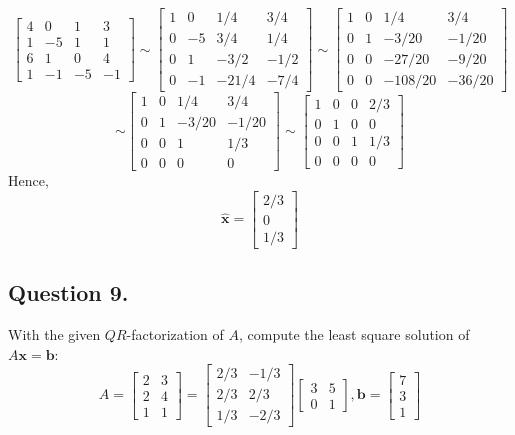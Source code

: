 \documentclass{article}
\begin{document}
\begin{enumerate} [label=(\arabic*)]
    \[\left[\begin{array}{rrrr}
    4 & 0 & 1 & 3 \\
    1 &-5 & 1 & 1 \\
    6 & 1 & 0 & 4 \\
    1 &-1 &-5 & -1
    \end{array}\right]\sim
    \left[\begin{array}{rrrr}
    1 & 0 & 1/4 & 3/4 \\
    0 &-5 & 3/4 & 1/4 \\
    0 & 1 &-3/2 &-1/2 \\
    0 &-1 &-21/4&-7/4
    \end{array}\right]\sim
    \left[\begin{array}{rrrr}
    1 & 0 & 1/4 & 3/4 \\
    0 & 1 &-3/20&-1/20\\
    0 & 0 &-27/20&-9/20\\
    0 & 0 &-108/20&-36/20
    \end{array}\right]\]\[\sim
    \left[\begin{array}{rrrr}
    1 & 0 & 1/4 & 3/4 \\
    0 & 1 &-3/20&-1/20\\
    0 & 0 &  1  & 1/3 \\
    0 & 0 &  0  &  0
    \end{array}\right]\sim
    \left[\begin{array}{rrrr}
    1 & 0 &  0  & 2/3 \\
    0 & 1 &  0  &  0  \\
    0 & 0 &  1  & 1/3 \\
    0 & 0 &  0  &  0
    \end{array}\right]
    \]
    Hence,
    \[\mathbf{\hat{x}}=\left[\begin{array}{r}2/3\\0\\1/3\end{array}\right]\]
\end{enumerate}
\subsection*{Question 9.}
With the given $QR$-factorization of $A$, compute the least square solution of $A\mathbf{x}=\mathbf{b}$:
\[
A=\left[
\begin{array}{rr}
 2 &  3 \\
 2 &  4 \\
 1 &  1
\end{array}
\right]
=\left[
\begin{array}{rr}
 2/3 &  -1/3 \\
 2/3 &   2/3 \\
 1/3 &  -2/3
\end{array}
\right]\left[
\begin{array}{rr}
 3 &  5 \\
 0 &  1
\end{array}
\right], \mathbf{b}=\left[\begin{array}{r}7\\3\\1\end{array}\right]
\]
\end{document}
